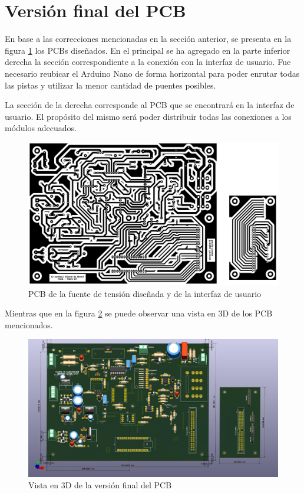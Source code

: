 \section{Versión final del PCB}
En base a las correcciones mencionadas en la sección anterior, se presenta en la figura \ref{F:PCB_prototipo2} los PCBs diseñados. En el principal se ha agregado en la parte inferior derecha la sección correspondiente a la conexión con la interfaz de usuario. Fue necesario reubicar el Arduino Nano de forma horizontal para poder enrutar todas las pistas y utilizar la menor cantidad de puentes posibles. \par 
La sección de la derecha corresponde al PCB que se encontrará en la interfaz de usuario. El propósito del mismo será poder distribuir todas las conexiones a los módulos adecuados.
\begin{figure}[H]
    \centering
    \includegraphics[width=\textwidth]{./imagenes/PCB_prototipo2.jpg}
    \caption{PCB de la fuente de tensión diseñada y de la interfaz de usuario}
    \label{F:PCB_prototipo2}
\end{figure}\par 
Mientras que en la figura \ref{F:3D_v2} se puede observar una vista en 3D de los PCB mencionados.
\begin{figure}[H]
    \centering
    \includegraphics[width=\textwidth]{./imagenes/3D_v2.jpg}
    \caption{Vista en 3D de la versión final del PCB}
    \label{F:3D_v2}
\end{figure}

